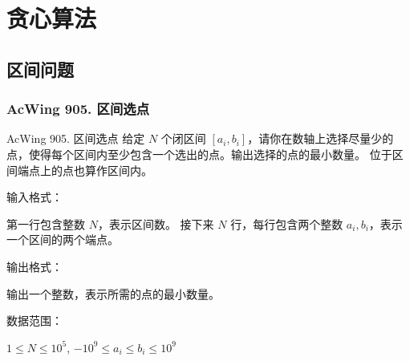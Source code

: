 \chapter{贪心算法}


\section{区间问题}

\subsection{AcWing 905. 区间选点}
\begin{titledbox}{AcWing 905. 区间选点}
    给定 $N$ 个闭区间 $[a_i,b_i]$，请你在数轴上选择尽量少的点，使得每个区间内至少包含一个选出的点。输出选择的点的最小数量。 位于区间端点上的点也算作区间内。

    输入格式：

    第一行包含整数 $N$，表示区间数。 接下来 $N$ 行，每行包含两个整数 $a_i,b_i$，表示一个区间的两个端点。

    输出格式：

    输出一个整数，表示所需的点的最小数量。

    数据范围：

    $1 \le N \le 10^5$, $-10^9 \le a_i \le b_i \le 10^9$

    \begin{inputblock}
         \\
         \\
         \\
    \end{inputblock}
    \begin{outputblock}
    \end{outputblock}
\end{titledbox}

